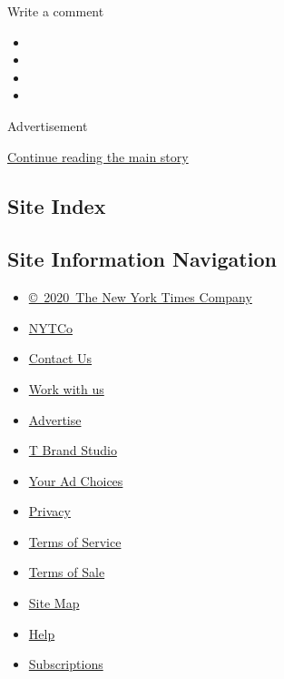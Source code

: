 Write a comment

\begin{itemize}
\item
\item
\item
\item
\end{itemize}

Advertisement

\protect\hyperlink{after-bottom}{Continue reading the main story}

\hypertarget{site-index}{%
\subsection{Site Index}\label{site-index}}

\hypertarget{site-information-navigation}{%
\subsection{Site Information
Navigation}\label{site-information-navigation}}

\begin{itemize}
\tightlist
\item
  \href{https://help.nytimes.com/hc/en-us/articles/115014792127-Copyright-notice}{©~2020~The
  New York Times Company}
\end{itemize}

\begin{itemize}
\tightlist
\item
  \href{https://www.nytco.com/}{NYTCo}
\item
  \href{https://help.nytimes.com/hc/en-us/articles/115015385887-Contact-Us}{Contact
  Us}
\item
  \href{https://www.nytco.com/careers/}{Work with us}
\item
  \href{https://nytmediakit.com/}{Advertise}
\item
  \href{http://www.tbrandstudio.com/}{T Brand Studio}
\item
  \href{https://www.nytimes.com/privacy/cookie-policy\#how-do-i-manage-trackers}{Your
  Ad Choices}
\item
  \href{https://www.nytimes.com/privacy}{Privacy}
\item
  \href{https://help.nytimes.com/hc/en-us/articles/115014893428-Terms-of-service}{Terms
  of Service}
\item
  \href{https://help.nytimes.com/hc/en-us/articles/115014893968-Terms-of-sale}{Terms
  of Sale}
\item
  \href{https://spiderbites.nytimes.com}{Site Map}
\item
  \href{https://help.nytimes.com/hc/en-us}{Help}
\item
  \href{https://www.nytimes.com/subscription?campaignId=37WXW}{Subscriptions}
\end{itemize}
